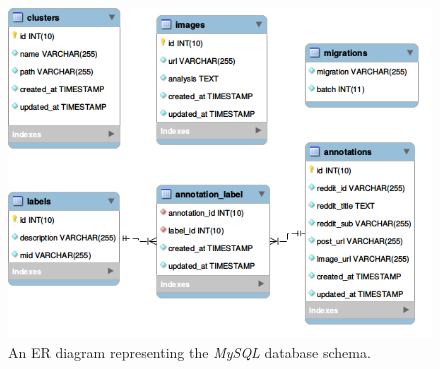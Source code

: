 \documentclass[msc,oneside]{ubcthesis}%
\begin{document}
\begin{figure}[!htb]
\includegraphics[width=\textwidth]{mysql_er_April_2.png}
\caption[MySQL Database schema]{
An ER diagram representing the \textit{MySQL} database schema.}
\label{fig:erdia}
\end{figure}
\end{document}
